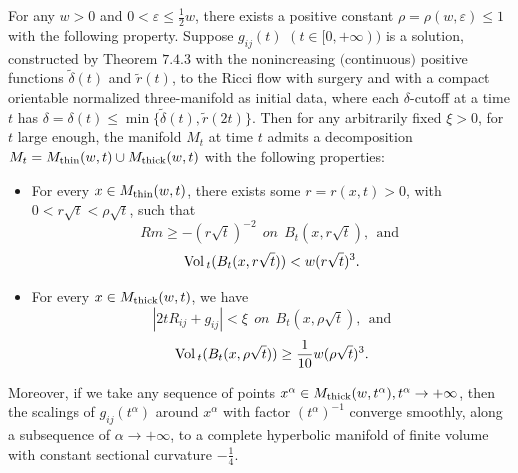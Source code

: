 \begin{theorem}
  \label{thm:cz-surgery-thick-thin-decomposition}

For any $w>0$ and $0 < \varepsilon \leq \frac{1}{2}w$, there
exists a positive constant $\rho = \rho(w,\varepsilon) \leq 1$
with the following property. Suppose $g_{ij}(t)$ $(t \in
[0,+\infty))$ is a solution, constructed by Theorem $7.4.3$ with
the nonincreasing $($continuous$)$ positive functions
$\widetilde{\delta}(t)$ and $\widetilde{r}(t)$, to the Ricci flow
with surgery and with a compact orientable normalized
three-manifold as initial data, where each $\delta$-cutoff at a
time $t$ has $\delta=\delta(t) \leq \min
\{\widetilde{\delta}(t),\widetilde{r}(2t)\}$. Then for any
arbitrarily fixed $\xi >0$, for $t$ large enough, the manifold
$M_t$ at time $t$ admits a decomposition $M_t=M_{\rm
thin}(w,t)\cup M_{\rm thick}(w,t)$ with the following properties:
\begin{itemize}
\item[(a)] For every $x\in M_{\rm thin}(w,t)$, there exists some
$r=r(x,t)>0$, with $0<r\sqrt{t}<\rho\sqrt{t}$, such that
$$
Rm\geq -(r\sqrt{t})^{-2} \ \ on \ \ B_t(x,r\sqrt{t}), \ \
\mbox{and }
$$
$$
{\rm Vol}\,_t(B_t(x,r\sqrt{t}))<w(r\sqrt{t})^3.
$$
\item[(b)] For every $x\in M_{\rm thick}(w,t)$, we have
$$
|2tR_{ij}+g_{ij}|<\xi\ \ on \ \ B_t(x,\rho\sqrt{t}), \ \ \mbox{and
}
$$
$$
{\rm Vol}\,_t(B_t(x,\rho\sqrt{t}))\geq \frac{1}{10}w(\rho\sqrt{t})^3.
$$
\end{itemize}
Moreover, if we take any sequence of points $x^{\alpha}\in M_{\rm
thick}(w,t^{\alpha}),t^{\alpha}\rightarrow+\infty$, then the
scalings of $g_{ij}(t^{\alpha})$ around $x^{\alpha}$ with factor
$(t^{\alpha})^{-1}$ converge smoothly, along a subsequence of
$\alpha\rightarrow+\infty$, to a complete hyperbolic manifold of
finite volume with constant sectional curvature $-\frac{1}{4}$.
\end{theorem}

